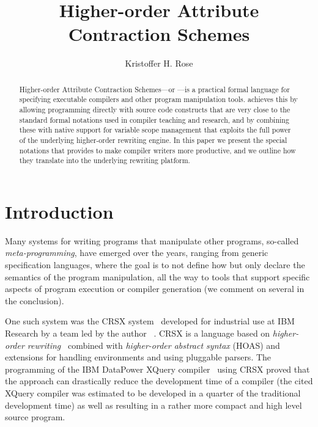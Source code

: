 \documentclass[letterpaper]{llncs}
\title{ Higher-order Attribute Contraction Schemes }
\author{ Kristoffer H. Rose }
\institute{ Two Sigma Investments, LLC \& Courant, New York University }
\begin{document}
\maketitle

\begin{abstract}
  Higher-order Attribute Contraction Schemes---or \HAX---is a practical formal language for
  specifying executable compilers and other program manipulation tools. \HAX achieves this by
  allowing programming directly with source code constructs that are very close to the standard
  formal notations used in compiler teaching and research, and by combining these with native
  support for variable scope management that exploits the full power of the underlying higher-order
  rewriting engine.  In this paper we present the special notations that \HAX provides to make
  compiler writers more productive, and we outline how they translate into the underlying rewriting
  platform.
\end{abstract}


\section{Introduction}\label{sec:intro}

Many systems for writing programs that manipulate other programs, so-called \emph{meta-programming},
have emerged over the years, ranging from generic specification languages, where the goal is to not
define how but only declare the semantics of the program manipulation, all the way to tools that
support specific aspects of program execution or compiler generation (we comment on several in the
conclusion).

One such system was the CRSX system~\cite{Rose:1996} developed for industrial use at IBM Research by
a team led by the author~\cite{Rose:hor2007,Rose:hor2010,Rose:rta2011,crsx} .  CRSX is a language
based on \emph{higher-order rewriting}~\cite{Jouannaud:klop2005} combined with \emph{higher-order
  abstract syntax} (HOAS) \cite{PfenningElliot:pldi1988} and extensions for handling environments
and using pluggable parsers.  The programming of the IBM Data\-Power XQuery
compiler~\cite{dp60:ibm2013} using CRSX proved that the approach can drastically reduce the
development time of a compiler (the cited XQuery compiler was estimated to be developed in a quarter
of the traditional development time) as well as resulting in a rather more compact and high level
source program.
\end{document}
